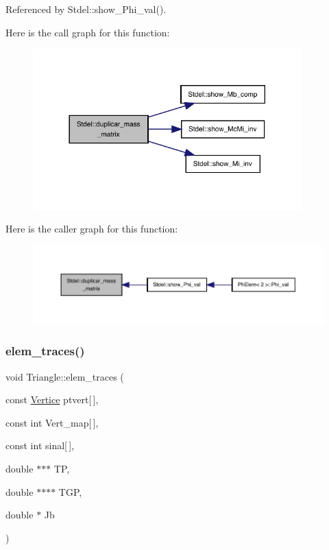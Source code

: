 Referenced by Stdel\+::show\+\_\+\+Phi\+\_\+val().

Here is the call graph for this function\+:
\nopagebreak
\begin{figure}[H]
\begin{center}
\leavevmode
\includegraphics[width=294pt]{classStdel_a922b779be1f8f12b7a5535ab529bff64_cgraph}
\end{center}
\end{figure}
Here is the caller graph for this function\+:
\nopagebreak
\begin{figure}[H]
\begin{center}
\leavevmode
\includegraphics[width=350pt]{classStdel_a922b779be1f8f12b7a5535ab529bff64_icgraph}
\end{center}
\end{figure}
\mbox{\label{classTriangle_ad27047d488aa9454fb5dbce44493bc52}} 
\subsubsection{\texorpdfstring{elem\+\_\+traces()}{elem\_traces()}}
{\footnotesize\ttfamily void Triangle\+::elem\+\_\+traces (\begin{DoxyParamCaption}\item[{const \hyperlink{structVertice}{Vertice}}]{ptvert\mbox{[}$\,$\mbox{]},  }\item[{const int}]{Vert\+\_\+map\mbox{[}$\,$\mbox{]},  }\item[{const int}]{sinal\mbox{[}$\,$\mbox{]},  }\item[{double $\ast$$\ast$$\ast$}]{TP,  }\item[{double $\ast$$\ast$$\ast$$\ast$}]{T\+GP,  }\item[{double $\ast$}]{Jb }\end{DoxyParamCaption})\hspace{0.3cm}{\ttfamily [virtual]}}



